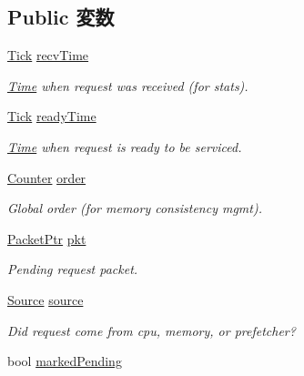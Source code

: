\subsection*{Public 変数}
\begin{DoxyCompactItemize}
\item 
\hyperlink{base_2types_8hh_a5c8ed81b7d238c9083e1037ba6d61643}{Tick} \hyperlink{classMSHR_1_1Target_afb564669ac735617979c31edf7f97e2a}{recvTime}
\begin{DoxyCompactList}\small\item\em \hyperlink{classTime}{Time} when request was received (for stats). \item\end{DoxyCompactList}\item 
\hyperlink{base_2types_8hh_a5c8ed81b7d238c9083e1037ba6d61643}{Tick} \hyperlink{classMSHR_1_1Target_a7cb362ebfb8750bd53baf5e8f96e00d0}{readyTime}
\begin{DoxyCompactList}\small\item\em \hyperlink{classTime}{Time} when request is ready to be serviced. \item\end{DoxyCompactList}\item 
\hyperlink{base_2types_8hh_ae1475755791765b8e6f6a8bb091e273e}{Counter} \hyperlink{classMSHR_1_1Target_a268baba59d9078c070be7059fd90d9bc}{order}
\begin{DoxyCompactList}\small\item\em Global order (for memory consistency mgmt). \item\end{DoxyCompactList}\item 
\hyperlink{classPacket}{PacketPtr} \hyperlink{classMSHR_1_1Target_a3a891bc2a0fcbe6be5297077d94e2df7}{pkt}
\begin{DoxyCompactList}\small\item\em Pending request packet. \item\end{DoxyCompactList}\item 
\hyperlink{classMSHR_1_1Target_a176e1eca2d1e3d1c6a064340bc6a351e}{Source} \hyperlink{classMSHR_1_1Target_a6bfef4fd519b1708e99617d59d9c62cd}{source}
\begin{DoxyCompactList}\small\item\em Did request come from cpu, memory, or prefetcher? \item\end{DoxyCompactList}\item 
bool \hyperlink{classMSHR_1_1Target_a790487cb2984966102e9eceeb2dd3015}{markedPending}
\end{DoxyCompactItemize}


